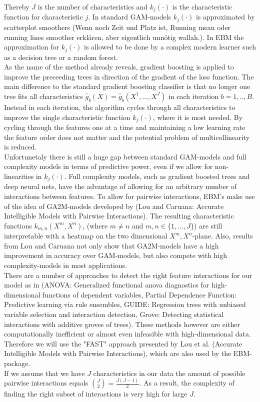 \documentclass[12pt,titlepage]{article}
\begin{document}
Thereby $J$ is the number of characteristics and $k_{j}(\cdot)$ is the characteristic function for characteristic $j$. In standard GAM-models $k_{j}(\cdot)$ is approximated by scatterplot smoothers (Wenn noch Zeit und Platz ist, Running mean oder running lines smoother erklären, aber eigentlich unnötig wallah.). In EBM the approximation for $k_{j}(\cdot)$ is allowed to be done by a complex modern learner such as a decision tree or a random forest. \\
As the name of the method already reveals, gradient boosting is applied to improve the preceeding trees in direction of the gradient of the loss function. The main difference to the standard gradient boosting classifier is that no longer one tree fits all characteristics $\hat{g}_{b}(X)=\hat{g}_{b}(X^{1}, ..., X^{J})$ in each iteration $b=1,..,B$. Instead in each iteration, the algorithm cycles through all characteristics to improve the single characteristic function $k_{j}(\cdot)$, where it is most needed. By cycling through the features one at a time and maintaining a low learning rate the feature order does not matter and the potential problem of multicollinearity is reduced. \\
Unfortunetaly there is still a huge gap between standard GAM-models and full complexity models in terms of predictive power, even if we allow for non-linearities in $k_{j}(\cdot)$. Full complexity models, such as gradient boosted trees and deep neural nets, have the advantage of allowing for an arbitrary number of interactions between features. To allow for pairwise interactions, EBM's make use of the idea of GA2M-models developed by (Lou and Caruana: Accurate Intelligible Models with Pairwise Interactions). The resulting characteristic functions $k_{m,n}(X^{m}, X^{n})$, (where $m\neq n$ and $m,n \in \{1,...,J\}$) are still interpretable with a heatmap on the two dimensional $X^{m}, X^{n}$-plane. Also, results from Lou and Caruana not only show that GA2M-models have a high improvement in accuracy over GAM-models, but also compete with high complexity-models in most applications. \\
There are a number of approaches to detect the right feature interactions for our model as in (ANOVA: Generalized functional anova diagnostics for high-dimensional functions of dependent variables, Partial Dependence Function: Predictive learning via rule ensembles, GUIDE: Regression trees with unbiased variable selection and interaction detection, Grove: Detecting statistical interactions with additive groves of trees). These methods however are either computationally inefficient or almost even infeasible with high-dimensional data. Therefore we will use the "FAST" approach presented by Lou et al. (Accurate Intelligible Models with Pairwise Interactions), which are also used by the EBM-package. \\
If we assume that we have $J$ characteristics in our data the amount of possible pairwise interactions equals $\binom{J}{2} = \frac{J(J-1)}{2}$. As a result, the complexity of finding the right subset of interactions is very high for large $J$. 
\end{document}
